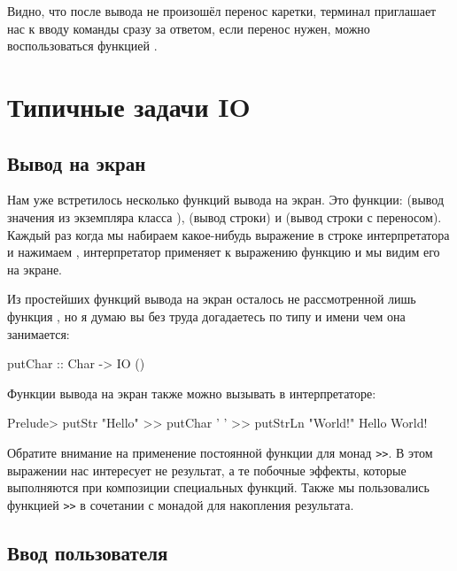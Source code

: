 
Видно, что после вывода не произошёл перенос каретки,
терминал приглашает нас к вводу команды сразу за ответом,
если перенос нужен, можно воспользоваться функцией .

\section{Типичные задачи IO}

\subsection{Вывод на экран}

Нам уже встретилось несколько функций вывода на экран.
Это функции:  (вывод значения из экземпляра класса ),
 (вывод строки) и  (вывод строки с переносом).
Каждый раз когда мы набираем какое-нибудь выражение в строке
интерпретатора и нажимаем , интерпретатор применяет
к выражению функцию  и мы видим его на экране.

Из простейших функций вывода на экран осталось не рассмотренной
лишь функция , но я думаю вы без труда догадаетесь
по типу и имени чем она занимается:

\begin{code}
putChar :: Char -> IO ()
\end{code}

Функции вывода на экран также можно вызывать в интерпретаторе:


\begin{code}
Prelude> putStr "Hello" >> putChar ' ' >> putStrLn "World!" 
Hello World!
\end{code}

Обратите внимание на применение постоянной функции для монад
\verb!>>!. В этом выражении нас интересует не результат, 
а те побочные эффекты, которые выполняются при композиции
специальных функций. Также мы пользовались функцией \verb!>>!
в сочетании с монадой  для накопления результата.

\subsection{Ввод пользователя}

